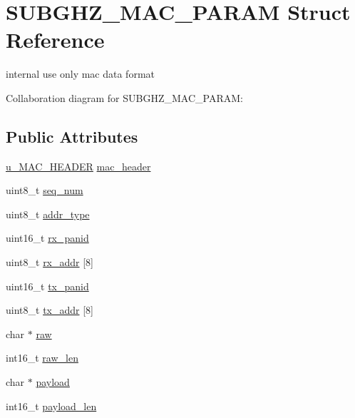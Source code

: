 \hypertarget{structSUBGHZ__MAC__PARAM}{\section{S\+U\+B\+G\+H\+Z\+\_\+\+M\+A\+C\+\_\+\+P\+A\+R\+A\+M Struct Reference}
\label{structSUBGHZ__MAC__PARAM}
}


internal use only mac data format  




Collaboration diagram for S\+U\+B\+G\+H\+Z\+\_\+\+M\+A\+C\+\_\+\+P\+A\+R\+A\+M\+:
\subsection*{Public Attributes}
\begin{DoxyCompactItemize}
\item 
\hyperlink{unionu__MAC__HEADER}{u\+\_\+\+M\+A\+C\+\_\+\+H\+E\+A\+D\+E\+R} \hyperlink{structSUBGHZ__MAC__PARAM_ae9b03fa8e80ff5d8bc75e1a443942979}{mac\+\_\+header}
\item 
uint8\+\_\+t \hyperlink{structSUBGHZ__MAC__PARAM_a2b0303bb30e00b9763830c10c80ce388}{seq\+\_\+num}
\item 
uint8\+\_\+t \hyperlink{structSUBGHZ__MAC__PARAM_a773f62bb35e71167b848c2e436b2c152}{addr\+\_\+type}
\item 
uint16\+\_\+t \hyperlink{structSUBGHZ__MAC__PARAM_a195d7e402bd71aa8a74b8e7e974c533f}{rx\+\_\+panid}
\item 
uint8\+\_\+t \hyperlink{structSUBGHZ__MAC__PARAM_a32a7bf98900c510442e3d10cc8f6e8b8}{rx\+\_\+addr} \mbox{[}8\mbox{]}
\item 
uint16\+\_\+t \hyperlink{structSUBGHZ__MAC__PARAM_a93156f56eec15fc04724c544fbe3e53b}{tx\+\_\+panid}
\item 
uint8\+\_\+t \hyperlink{structSUBGHZ__MAC__PARAM_a8bd91971f48d96f7cd9b3d76e1c38b06}{tx\+\_\+addr} \mbox{[}8\mbox{]}
\item 
char $\ast$ \hyperlink{structSUBGHZ__MAC__PARAM_ad359fe80ff1d295fd5b00543b60ea5b2}{raw}
\item 
int16\+\_\+t \hyperlink{structSUBGHZ__MAC__PARAM_a42ab1633b25c19a4093ada2deacf1a27}{raw\+\_\+len}
\item 
char $\ast$ \hyperlink{structSUBGHZ__MAC__PARAM_ae934908b5d0baeb4460061738930bee1}{payload}
\item 
int16\+\_\+t \hyperlink{structSUBGHZ__MAC__PARAM_a825e21d272b027505268d82411bf341f}{payload\+\_\+len}
\end{DoxyCompactItemize}


